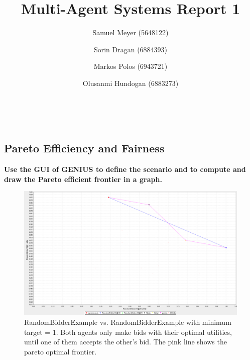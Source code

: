 \documentclass[a4paper,11pt]{article}
\makeatletter
\theoremstyle{mytheor}
\renewcommand{\maketitle}{
\begin{center}
\vspace{2ex}
{\huge \textsc{\@title}}
\vspace{1ex}
\\
\begin{center}
    \@author
\end{center}
\end{center}
}
\makeatother
\begin{document}
\title{Multi-Agent Systems Report 1}

\author{Samuel Meyer (5648122) \and Sorin Dragan (6884393) \and Markos Polos (6943721) \and Olusanmi Hundogan (6883273)}

\maketitle
\hline

\addtocounter{section}{1}
\subsection{Pareto Efficiency and Fairness}
\textbf{Use the GUI of GENIUS to define the scenario and to compute and draw the Pareto efficient frontier in a graph.}

\begin{figure}[h!]
  \centering
  \includegraphics[width=0.45\linewidth]{report1/RB10vs10_100r.png}
  \caption{RandomBidderExample vs. RandomBidderExample with minimum target = 1. Both agents only make bids with their optimal utilities, until one of them accepts the other's bid. The pink line shows the pareto optimal frontier. }
  \label{fig:trials}
\end{figure}
\end{document}
